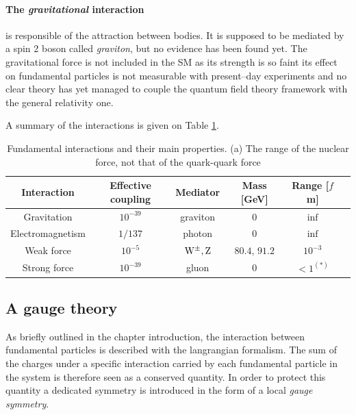 \paragraph{The \emph{gravitational} interaction} is responsible of the attraction between bodies. It is supposed to be mediated by a spin 2 boson called \emph{graviton}, but no evidence has been found yet. The gravitational force is not included in the SM as its strength is so faint its effect on fundamental particles is not measurable with present--day experiments and no clear theory has yet managed to couple the quantum field theory framework with the general relativity one.

A summary of the interactions is given on Table \ref{tab:bosons}.

\begin{table}
\caption{Fundamental interactions and their main properties. (a) The range of the nuclear force, not that of the quark-quark force}
\label{tab:bosons}
\begin{center}
\begin{tabular}{ c c c c c c}
\hline
Interaction & Effective coupling & Mediator & Mass [GeV] & Range [$f$m]\\
\hline
Gravitation & $10^{-39}$ & graviton & 0 & $\inf$ \\
Electromagnetism & $1/137$ & photon & 0 & $\inf$ \\
Weak force & $10^{-5}$ & $\mathrm{W}^\pm,\mathrm{Z}$ & $80.4,\,91.2$ & $10^{-3}$ \\
Strong force & $10^{-39}$ & gluon & 0 & $<1^{(*)}$ \\
\hline
\end{tabular}
\end{center}
\end{table}

\subsection{A gauge theory}

As briefly outlined in the chapter introduction, the interaction between fundamental particles is described with the langrangian formalism. The sum of the charges under a specific interaction carried by each fundamental particle in the system is therefore seen as a conserved quantity. In order to protect this quantity a dedicated symmetry is introduced in the form of a local \emph{gauge symmetry}. 

